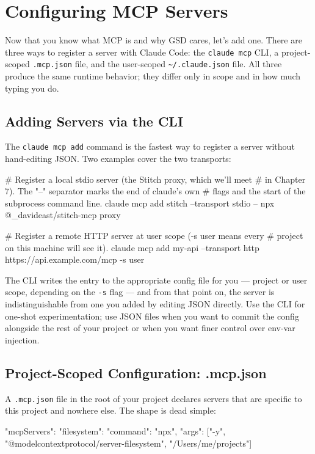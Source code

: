 \documentclass[11pt,letterpaper,openany]{book}
\begin{document}
\chapter{Configuring MCP Servers}

Now that you know what MCP is and why GSD cares, let's add one. There are
three ways to register a server with Claude Code: the \texttt{claude mcp}
CLI, a project-scoped \texttt{.mcp.json} file, and the user-scoped
\texttt{\~{}/.claude.json} file. All three produce the same runtime
behavior; they differ only in scope and in how much typing you do.

\section{Adding Servers via the CLI}

The \texttt{claude mcp add} command is the fastest way to register a
server without hand-editing JSON. Two examples cover the two transports:

\begin{gsdbash}
# Register a local stdio server (the Stitch proxy, which we'll meet
# in Chapter 7). The "--" separator marks the end of claude's own
# flags and the start of the subprocess command line.
claude mcp add stitch --transport stdio -- npx @_davideast/stitch-mcp proxy

# Register a remote HTTP server at user scope (-s user means every
# project on this machine will see it).
claude mcp add my-api --transport http https://api.example.com/mcp -s user
\end{gsdbash}

The CLI writes the entry to the appropriate config file for you ---
project or user scope, depending on the \texttt{-s} flag --- and from that
point on, the server is indistinguishable from one you added by editing
JSON directly. Use the CLI for one-shot experimentation; use JSON files
when you want to commit the config alongside the rest of your project
or when you want finer control over env-var injection.

\section{Project-Scoped Configuration: .mcp.json}

A \texttt{.mcp.json} file in the root of your project declares servers
that are specific to this project and nowhere else. The shape is dead
simple:

\begin{gsdjson}
{
  "mcpServers": {
    "filesystem": {
      "command": "npx",
      "args": ["-y", "@modelcontextprotocol/server-filesystem", "/Users/me/projects"]
    }
  }
}
\end{gsdjson}
\end{document}
